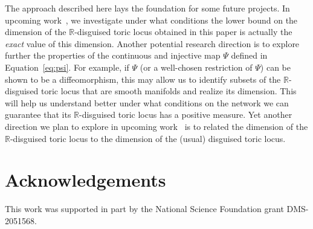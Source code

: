 \documentclass[11pt]{article}
\theoremstyle{plain}
\theoremstyle{definition}
\theoremstyle{remark}
\newcommand\RR{\mathbb{R}}
\begin{document}
The approach described here lays the foundation for some future projects. In upcoming work~\cite{disg_2}, we investigate under what conditions the lower bound on the dimension of the $\RR$-disguised toric locus obtained in this paper is actually the {\em exact} value of this dimension. Another potential research direction is to explore further the properties of the continuous and injective map $\Psi$ defined in Equation~\ref{eq:psi}. For example, if  $\Psi$ (or a well-chosen restriction of $\Psi$) can be shown to be a diffeomorphism, this may allow us to identify subsets of the $\RR$-disguised toric locus that are smooth manifolds and realize its dimension. This will help us understand better under what conditions on the network  we can guarantee that its $\RR$-disguised toric locus has a positive measure. Yet another direction we plan to explore in upcoming work~\cite{disg_3} is to related the dimension of the $\RR$-disguised toric locus to the dimension of the (usual) disguised toric locus.




\section*{Acknowledgements} 

This work was supported in part by the National Science Foundation grant DMS-2051568.  




\end{document}
